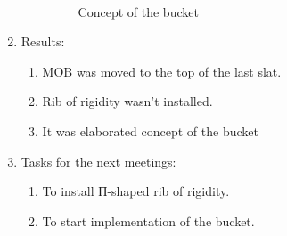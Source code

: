 \begin{enumerate}
\begin{enumerate}
	  \begin{figure}[H]
	  	\begin{minipage}[h]{0.2\linewidth}
	  		\center  
	  	\end{minipage}
	  	\begin{minipage}[h]{0.6\linewidth}
	  		\caption{Concept of the bucket}
	  	\end{minipage}
	  \end{figure}
	  
    \end{enumerate}
    
	\item Results: 
	\begin{enumerate}
	  \item MOB was moved to the top of the last slat.
	  
	  \item Rib of rigidity wasn't installed.
	  
	  \item It was elaborated concept of the bucket
	  
    \end{enumerate}
    
	\item Tasks for the next meetings:
	\begin{enumerate}
	  \item To install П-shaped rib of rigidity.
	  
	  \item To start implementation of the bucket.
	  
    \end{enumerate}     
\end{enumerate}
\fillpage